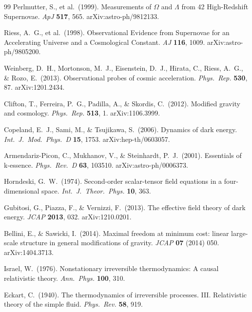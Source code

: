 \documentclass[12pt,a4paper]{article}
\begin{document}
\begin{thebibliography}{99}
Perlmutter, S., et al.\ (1999).
Measurements of $\Omega$ and $\Lambda$ from 42 High-Redshift Supernovae.
\textit{ApJ} \textbf{517}, 565. arXiv:astro-ph/9812133.

Riess, A.~G., et al.\ (1998).
Observational Evidence from Supernovae for an Accelerating Universe and a Cosmological Constant.
\textit{AJ} \textbf{116}, 1009. arXiv:astro-ph/9805200.

Weinberg, D.~H., Mortonson, M.~J., Eisenstein, D.~J., Hirata, C., Riess, A.~G., \& Rozo, E.\ (2013).
Observational probes of cosmic acceleration.
\textit{Phys.\ Rep.} \textbf{530}, 87. arXiv:1201.2434.

Clifton, T., Ferreira, P.~G., Padilla, A., \& Skordis, C.\ (2012).
Modified gravity and cosmology.
\textit{Phys.\ Rep.} \textbf{513}, 1. arXiv:1106.3999.

Copeland, E.~J., Sami, M., \& Tsujikawa, S.\ (2006).
Dynamics of dark energy.
\textit{Int.\ J.\ Mod.\ Phys.\ D} \textbf{15}, 1753. arXiv:hep-th/0603057.

Armendariz-Picon, C., Mukhanov, V., \& Steinhardt, P.~J.\ (2001).
Essentials of k-essence.
\textit{Phys.\ Rev.\ D} \textbf{63}, 103510. arXiv:astro-ph/0006373.

Horndeski, G.~W.\ (1974).
Second-order scalar-tensor field equations in a four-dimensional space.
\textit{Int.\ J.\ Theor.\ Phys.} \textbf{10}, 363.

Gubitosi, G., Piazza, F., \& Vernizzi, F.\ (2013).
The effective field theory of dark energy.
\textit{JCAP} \textbf{2013}, 032. arXiv:1210.0201.

Bellini, E., \& Sawicki, I.\ (2014).
Maximal freedom at minimum cost: linear large-scale structure in general modifications of gravity.
\textit{JCAP} \textbf{07} (2014) 050. arXiv:1404.3713.

Israel, W.\ (1976).
Nonstationary irreversible thermodynamics: A causal relativistic theory.
\textit{Ann.\ Phys.} \textbf{100}, 310.

Eckart, C.\ (1940).
The thermodynamics of irreversible processes. III. Relativistic theory of the simple fluid.
\textit{Phys.\ Rev.} \textbf{58}, 919.


\end{thebibliography}
\end{document}
